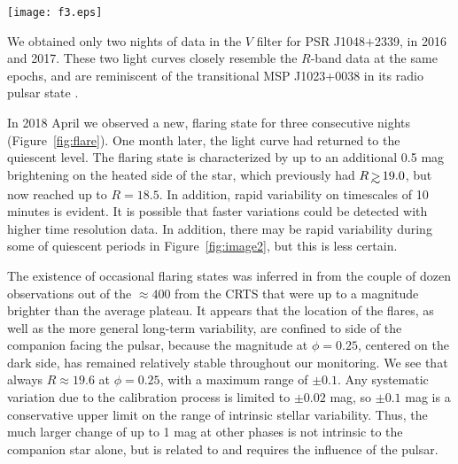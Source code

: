 \documentclass[iop]{emulateapj}
\def\simgr{\,\hbox{\hbox{$ > $}\kern -0.8em \lower 1.0ex\hbox{$\sim$}}\,}
\newcommand{\chandra}{{\it Chandra}}
\newcommand{\msptwo}{PSR J1048$+$2339}
\begin{document}
\begin{figure*}
\texttt{[image: f3.eps]}
\caption{\chandra\ light curves of \msptwo\ from three observations.
The left-hand panels show the orbital phase and energy of each photon,
with the vertical dashed lines marking the start and end of the observation.
Each observation spans slightly more than one pulsar orbit.
The right-hand panels are the binned light curves corrected for exposure
time at each orbital phase.  In the first two observations the
binned light curve is repeated for clarity.  The third observation
is dominated by flares.  The inset shows the main flare in 100~s bins.
}
\label{fig:xray}
\end{figure*}

We obtained only two nights of data in the $V$ filter for \msptwo,
in 2016 and 2017.  These two light curves closely resemble the $R$-band
data at the same epochs, and are reminiscent of the transitional MSP 
J1023+0038 in its radio pulsar state \citep{wou04,tho05}.

In 2018 April we observed a new, flaring state
for three consecutive nights (Figure~\ref{fig:flare}).
One month later, the light curve had returned to the
quiescent level.  The flaring
state is characterized by up to an additional
0.5 mag brightening on the heated side of the star,
which previously had $R\simgr19.0$,
but now reached up to $R=18.5$.  In addition, rapid
variability on timescales of 10 minutes is evident.
It is possible that faster variations could be detected
with higher time resolution data. In addition, there
may be rapid variability during some of quiescent periods
in Figure~\ref{fig:image2}, but this is less certain.

The existence of occasional
flaring states was inferred in \citet{den16} from the
couple of dozen observations out of the $\approx 400$
from the CRTS that were up to a magnitude brighter than
the average plateau. It appears that the location of the
flares, as well as the more general long-term variability,
are confined to side of the companion facing the pulsar,
because the magnitude at $\phi=0.25$, centered on the
dark side, has remained relatively stable throughout
our monitoring.  We see that always $R\approx19.6$
at $\phi=0.25$, with a maximum range of $\pm0.1$.
Any systematic variation due to the calibration process
is limited to $\pm0.02$ mag, so $\pm0.1$ mag is a conservative
upper limit on the range of intrinsic stellar variability.
Thus, the much larger change of up to 1 mag at other phases
is not intrinsic to the companion star alone,
but is related to and requires the influence of the pulsar.
\end{document}
